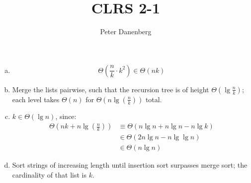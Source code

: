 \documentclass{article}
\title{CLRS 2-1}
\author{Peter Danenberg}
\begin{document}
\maketitle

\begin{enumerate}[a.]
\item \[\Theta(\frac{n}{k}\cdot k^2) \in \Theta(nk)\]
\item Merge the lists pairwise, such that the recursion tree is of
  height \(\Theta(\lg \frac{n}{k})\); each level takes \(\Theta(n)\) for \(\Theta(n
 \lg(\frac{n}{k}))\) total.
\item \(k \in \Theta(\lg n)\), since:
\begin{align}
  \Theta(nk + n\lg(\frac{n}{k})) &\equiv \Theta(n\lg n + n\lg n - n\lg k)\\
  &\in \Theta(2n\lg n - n\lg\lg n)\\
  &\in \Theta(n\lg n)
\end{align}
\item Sort strings of increasing length until insertion sort surpasses
  merge sort; the cardinality of that list is $k$.
\end{enumerate}
\end{document}
